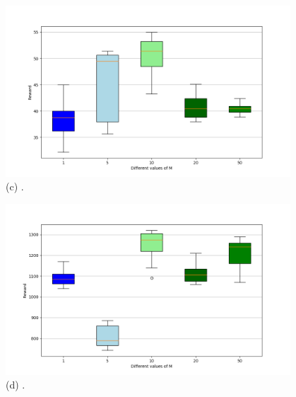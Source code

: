 \begin{figure}[hH]
\begin{minipage}[b]{.45\textwidth}
        \label{fig:boxplot:walker}
    \end{minipage}
    \begin{minipage}[b]{0.45\textwidth}
        \centering
        \includegraphics[width=0.95\textwidth]{figures/Swimmer-v1.png} \\
        (c) .
    \end{minipage}
    \begin{minipage}[b]{0.45\textwidth}
        \centering
        \includegraphics[width=0.95\textwidth]{figures/Humanoid-v1.png} \\
        (d) .
    \end{minipage}
    

\end{figure}
